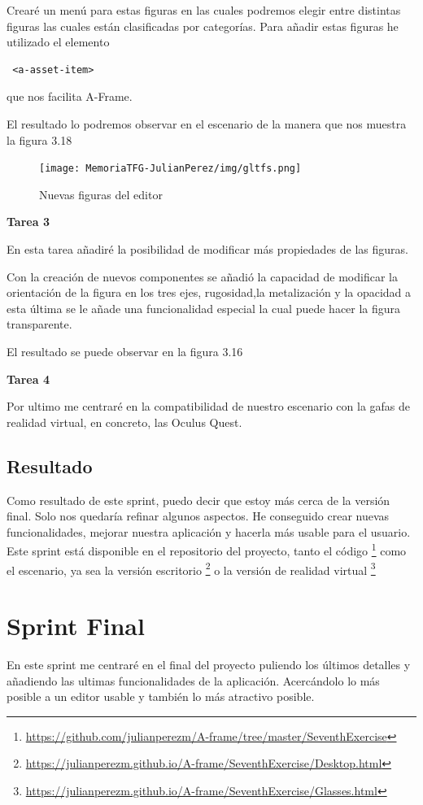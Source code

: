 \documentclass[a4paper, 12pt]{book}
\begin{document}
Crearé un menú para estas figuras en las cuales podremos elegir entre distintas figuras las cuales están clasificadas por categorías. Para añadir estas figuras he utilizado el elemento \begin{verbatim} <a-asset-item>\end{verbatim} que nos facilita A-Frame.

El resultado lo podremos observar en el escenario de la manera que nos muestra la figura 3.18

\begin{figure}[H]
  \centering
  \texttt{[image: MemoriaTFG-JulianPerez/img/gltfs.png]}
  \caption{Nuevas figuras del editor}\label{fig}
\end{figure}

\textbf{Tarea 3}

En esta tarea añadiré la posibilidad de modificar más propiedades de las figuras.

Con la creación de nuevos componentes se añadió la capacidad de modificar la orientación de la figura en los tres ejes, rugosidad,la metalización y la opacidad a esta última se le añade una funcionalidad especial la cual puede hacer la figura transparente.

El resultado se puede observar en la figura 3.16

\textbf{Tarea 4}

Por ultimo me centraré en la compatibilidad de nuestro escenario con la gafas de realidad virtual, en concreto, las Oculus Quest. 

\subsection{Resultado}

Como resultado de este sprint, puedo decir que estoy más cerca de la versión final. Solo nos quedaría refinar algunos aspectos. He conseguido crear nuevas funcionalidades, mejorar nuestra aplicación y hacerla más usable para el usuario. Este sprint está disponible en el repositorio del proyecto, tanto el código \footnote{\url{https://github.com/julianperezm/A-frame/tree/master/SeventhExercise}} como el escenario, ya sea la versión escritorio \footnote{\url{https://julianperezm.github.io/A-frame/SeventhExercise/Desktop.html}} o la versión de realidad virtual \footnote{\url{https://julianperezm.github.io/A-frame/SeventhExercise/Glasses.html}}

\section{Sprint Final}
En este sprint me centraré en el final del proyecto puliendo los últimos detalles y añadiendo las ultimas funcionalidades de la aplicación. Acercándolo lo más posible a un editor usable y también lo más atractivo posible.
\end{document}

